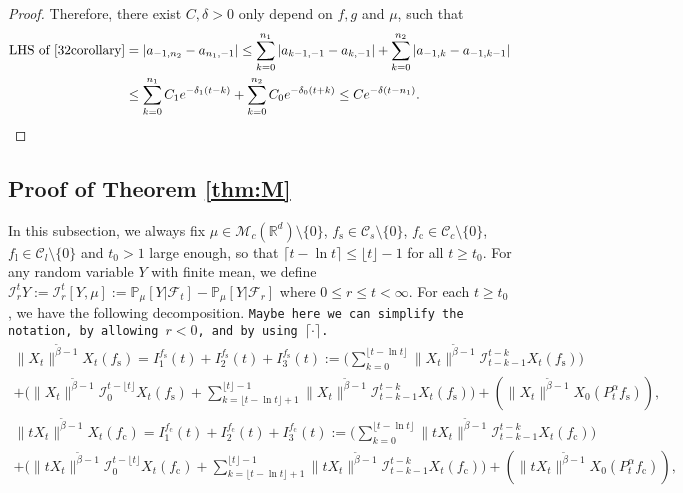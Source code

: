 \documentclass[12pt,a4paper]{amsart}
\theoremstyle{plain}
\theoremstyle{definition}
\numberwithin{equation}{section}
\begin{document}
\begin{proof}
  Therefore, there exist $C,\delta >0$ {\color{red} only depend on $f,g$ and $\mu$, such that }
  \begin{align}
    \text{LHS of \eqref{32corollary}}
    & = \left|a_{-1,n_2}-a_{n_1,-1}\right|
      \leq \sum_{k=0}^{n_1}\left|a_{k-1,-1}-a_{k,-1}\right|+\sum_{k=0}^{n_2}\left|a_{-1,k}-a_{-1,k-1}\right|\\
     & \leq \sum_{k=0}^{n_1} C_1 e^{-\delta_1 (t-k)}+\sum_{k=0}^{n_2} C_0 e^{-\delta_0 (t+k)}
      \leq C e^{- \delta (t-n_1)}.
      \qedhere
  \end{align}
\end{proof}

\subsection{Proof of Theorem \ref{thm:M}}
\label{sec: main}
In this subsection, we always fix {\color{red} $\mu \in \mathcal M_c(\mathbb R^d)\setminus\{0\}$, $f_\mathrm s\in \mathcal C_s\setminus\{0\}$,  $f_\mathrm c\in \mathcal C_c\setminus\{0\}$, $f_\mathrm l\in \mathcal C_l\setminus\{0\}$} and $t_0>1$ large enough, so that $\lceil t-\ln t\rceil \leq \lfloor t \rfloor - 1$ for all $t\geq t_0$.
	For any random variable $Y$ with finite mean, we define $\mathcal I_r^t Y:= \mathcal I_r^t [Y, \mu] := \mathbb P_\mu[Y|\mathscr F_t] - \mathbb P_\mu[Y|\mathscr F_r]$ where $0 \leq r \leq t <\infty.$
	For each $t\geq t_0$, we have the following decomposition.
		{\color{blue} \tt Maybe here we can simplify the notation, by allowing $r<0$, and by using $\lceil \cdot \rceil$.}
  \begin{multline}
    \label{eq:PM:CLTS:1}
     \|X_t\|^{\tilde \beta - 1}  X_t(f_\mathrm s)
     = I^{f_\mathrm s}_1(t) + I^{f_\mathrm s}_2(t) + I^{f_\mathrm s}_3(t)
    := \Big(\sum_{k=0}^{\lfloor t-\ln t \rfloor}  \|X_t\|^{\tilde \beta - 1} \mathcal I_{t-k-1}^{t-k} X_t(f_\mathrm s) \Big)\\
    + \Big(  \|X_t\|^{\tilde \beta - 1} \mathcal I_0^{t-\lfloor t \rfloor} X_t(f_\mathrm s)   + \sum_{k=\lfloor t-\ln t \rfloor+1}^{\lfloor t \rfloor-1} \|X_t\|^{\tilde \beta - 1} \mathcal I_{t-k-1}^{t-k} X_t(f_\mathrm s) \Big) + ( \|X_t\|^{\tilde \beta - 1}X_0(P_t^\alpha f_\mathrm s) ),
  \end{multline}
  \begin{multline}
    \label{eq:PM:CLTS:2}
     \|tX_t\|^{\tilde \beta - 1}  X_t(f_\mathrm c)
     = I^{f_\mathrm c}_1(t) + I^{f_\mathrm c}_2(t) + I^{f_\mathrm c}_3(t)
    := \Big(\sum_{k=0}^{\lfloor t-\ln t \rfloor}  \|tX_t\|^{\tilde \beta - 1} \mathcal I_{t-k-1}^{t-k} X_t(f_\mathrm c) \Big)\\
    + \Big(  \|tX_t\|^{\tilde \beta - 1} \mathcal I_0^{t-\lfloor t \rfloor} X_t(f_\mathrm c)   + \sum_{k=\lfloor t-\ln t \rfloor+1}^{\lfloor t \rfloor-1} \|tX_t\|^{\tilde \beta - 1} \mathcal I_{t-k-1}^{t-k} X_t(f_\mathrm c) \Big) + ( \|tX_t\|^{\tilde \beta - 1}X_0(P_t^\alpha f_\mathrm c) ),
  \end{multline}
\end{document}

